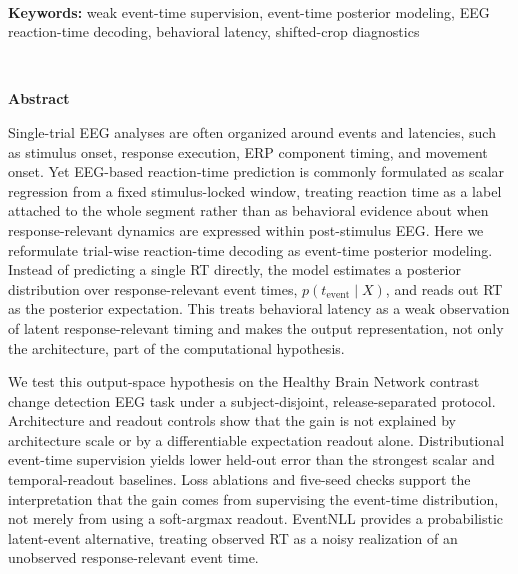 \documentclass[12pt]{article}
\begin{document}
\ \\[-2mm]
{\bf Keywords:} weak event-time supervision, event-time posterior modeling, EEG reaction-time decoding, behavioral latency, shifted-crop diagnostics

\thispagestyle{empty}
%
\ \vspace{-0mm}\\
%
\begin{center} {\bf Abstract} \end{center}



Single-trial EEG analyses are often organized around events and latencies, such as stimulus onset, response execution, ERP component timing, and movement onset. Yet EEG-based reaction-time prediction is commonly formulated as scalar regression from a fixed stimulus-locked window, treating reaction time as a label attached to the whole segment rather than as behavioral evidence about when response-relevant dynamics are expressed within post-stimulus EEG. Here we reformulate trial-wise reaction-time decoding as event-time posterior modeling. Instead of predicting a single RT directly, the model estimates a posterior distribution over response-relevant event times, \(p(t_{\mathrm{event}} \mid X)\), and reads out RT as the posterior expectation. This treats behavioral latency as a weak observation of latent response-relevant timing and makes the output representation, not only the architecture, part of the computational hypothesis.

We test this output-space hypothesis on the Healthy Brain Network contrast change detection EEG task under a subject-disjoint, release-separated protocol. Architecture and readout controls show that the gain is not explained by architecture scale or by a differentiable expectation readout alone. Distributional event-time supervision yields lower held-out error than the strongest scalar and temporal-readout baselines. Loss ablations and five-seed checks support the interpretation that the gain comes from supervising the event-time distribution, not merely from using a soft-argmax readout. EventNLL provides a probabilistic latent-event alternative, treating observed RT as a noisy realization of an unobserved response-relevant event time.
\end{document}
